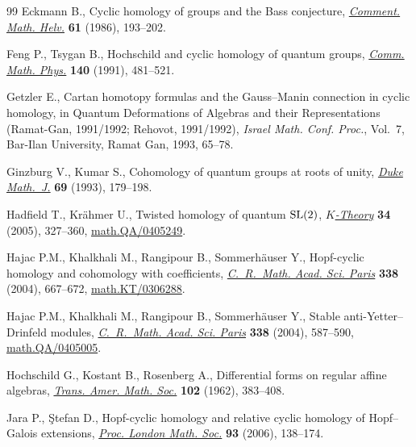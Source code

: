 \documentclass[pdftex]{sigma}
\numberwithin{equation}{section}
\begin{document}
\begin{thebibliography}{99}
Eckmann B., Cyclic homology of groups and the {B}ass conjecture,
  \href{http://dx.doi.org/10.1007/BF02621911}{\textit{Comment. Math. Helv.}} \textbf{61} (1986), 193--202.

Feng P., Tsygan B., Hochschild and cyclic homology of quantum groups,
  \href{http://dx.doi.org/10.1007/BF02099132}{\textit{Comm. Math. Phys.}} \textbf{140} (1991), 481--521.

Getzler E., Cartan homotopy formulas and the {G}auss--{M}anin connection in
  cyclic homology, in Quantum Deformations of Algebras and their
  Representations ({R}amat-{G}an, 1991/1992; {R}ehovot, 1991/1992),
  \textit{Israel Math. Conf. Proc.}, Vol.~7, Bar-Ilan University, Ramat Gan,
  1993, 65--78.

Ginzburg V., Kumar S., Cohomology of quantum groups at roots of unity,
  \href{http://dx.doi.org/10.1215/S0012-7094-93-06909-8}{\textit{Duke Math.~J.}} \textbf{69} (1993), 179--198.

Hadf\/ield T., Kr{\"a}hmer U., Twisted homology of quantum {${\rm SL}(2)$},
  \href{http://dx.doi.org/10.1007/s10977-005-3118-2}{\textit{$K$-Theory}} \textbf{34} (2005), 327--360, \href{http://arxiv.org/abs/math.QA/0405249}{math.QA/0405249}.

Hajac P.M., Khalkhali M., Rangipour B., Sommerh{\"a}user Y., Hopf-cyclic
  homology and cohomology with coef\/f\/icients, \href{http://dx.doi.org/10.1016/j.crma.2003.11.036}{\textit{C.~R.~Math. Acad. Sci.
  Paris}} \textbf{338} (2004), 667--672, \href{http://arxiv.org/abs/math.KT/0306288}{math.KT/0306288}.

Hajac P.M., Khalkhali M., Rangipour B., Sommerh{\"a}user Y., Stable
  anti-{Y}etter--{D}rinfeld modules, \href{http://dx.doi.org/10.1016/j.crma.2003.11.037}{\textit{C.~R.~Math. Acad. Sci. Paris}}
  \textbf{338} (2004), 587--590, \href{http://arxiv.org/abs/math.QA/0405005}{math.QA/0405005}.

Hochschild G., Kostant B., Rosenberg A., Dif\/ferential forms on regular af\/f\/ine
  algebras, \href{http://dx.doi.org/10.1090/S0002-9947-1962-0142598-8}{\textit{Trans. Amer. Math. Soc.}} \textbf{102} (1962), 383--408.

Jara P., {\c{S}}tefan D., Hopf-cyclic homology and relative cyclic homology of
  {H}opf--{G}alois extensions, \href{http://dx.doi.org/10.1017/S0024611506015772}{\textit{Proc. London Math. Soc.}} \textbf{93}
  (2006), 138--174.


\end{thebibliography}
\end{document}
